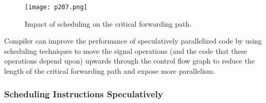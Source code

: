 \begin{figure}[H]
	\centering
	\texttt{[image: p207.png]}
	\caption{ Impact of scheduling on the critical forwarding path.}
	\label{fig:p207}
\end{figure}

Compiler can improve the performance of speculatively parallelized code by
using scheduling techniques to move the signal operations (and the code that these operations depend upon)
upwards through the control flow graph to reduce the length of the
critical forwarding path and expose more parallelism.

\subsubsection{Scheduling Instructions Speculatively}







